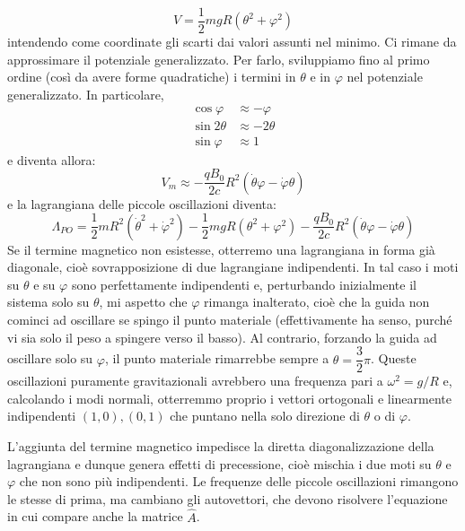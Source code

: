 \documentclass[a4paper,openany]{article}
\begin{document}
	\begin{equation}\label{key}
		V = \dfrac{1}{2}mgR(\theta^{2}+\varphi^{2})
	\end{equation}
	intendendo come coordinate gli scarti dai valori assunti nel minimo.
	Ci rimane da approssimare il potenziale generalizzato. Per farlo, sviluppiamo fino al primo ordine (così da avere forme quadratiche) i termini in $\theta$ e in $\varphi$ nel potenziale generalizzato. In particolare,
	\begin{equation}\label{key}
		\begin{aligned}
			\cos\varphi &\approx - \varphi
			\\
			\sin2\theta &\approx -2\theta \\
			\sin\varphi &\approx 1 
		\end{aligned}
	\end{equation}
	e diventa allora:
	\begin{equation}\label{key}
		V_{m} \approx  -\dfrac{qB_0}{2c}R^2(\dot{\theta}\varphi-\dot{\varphi}\theta)
	\end{equation}
	e la lagrangiana delle piccole oscillazioni diventa:
	\begin{equation}\label{key}
		\Lambda_{PO} = \dfrac{1}{2}mR^{2}(\dot{\theta}^{2}+\dot{\varphi}^{2}) - \dfrac{1}{2}mgR(\theta^{2}+\varphi^{2}) -\dfrac{qB_0}{2c}R^2(\dot{\theta}\varphi-\dot{\varphi}\theta)
	\end{equation}
	Se il termine magnetico non esistesse, otterremo una lagrangiana in forma già diagonale, cioè sovrapposizione di due lagrangiane indipendenti. In tal caso i moti su $\theta$ e su $\varphi$ sono perfettamente indipendenti e, perturbando inizialmente il sistema solo su $\theta$, mi aspetto che $\varphi$ rimanga inalterato, cioè che la guida non cominci ad oscillare se spingo il punto materiale (effettivamente ha senso, purché vi sia solo il peso a spingere verso il basso). Al contrario, forzando la guida ad oscillare solo su $\varphi$, il punto materiale rimarrebbe sempre a $\theta = \dfrac{3}{2}\pi$. Queste oscillazioni puramente gravitazionali avrebbero una frequenza pari a $\omega^2 = g/R$ e, calcolando i modi normali, otterremmo proprio i vettori ortogonali e linearmente indipendenti $(1,0), (0,1)$ che puntano nella solo direzione di $\theta$ o di $\varphi$.
	
	
	L'aggiunta del termine magnetico impedisce la diretta diagonalizzazione della lagrangiana e dunque genera effetti di precessione, cioè mischia i due moti su $\theta$ e $\varphi$ che non sono più indipendenti. Le frequenze delle piccole oscillazioni rimangono le stesse di prima, ma cambiano gli autovettori, che devono risolvere l'equazione in cui compare anche la matrice $\hat{A}$.
\end{document}

